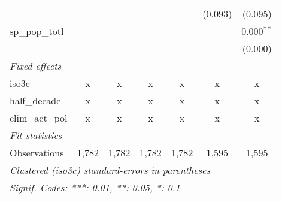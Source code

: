 \begin{tabular}{lcccccc}
                                                     &         &         &         &         & (0.093)        & (0.095)\\   
   sp\_pop\_totl                                     &         &         &         &         &                & 0.000$^{**}$\\   
                                                     &         &         &         &         &                & (0.000)\\   
   \emph{Fixed effects}\\
   iso3c                                             & x       & x       & x       & x       & x              & x\\  
   half\_decade                                      & x       & x       & x       & x       & x              & x\\  
   clim\_act\_pol                                    & x       & x       & x       & x       & x              & x\\  
   \midrule \emph{Fit statistics}\\
   Observations                                      & 1,782   & 1,782   & 1,782   & 1,782   & 1,595          & 1,595\\  
   \midrule
   \multicolumn{7}{l}{\emph{Clustered (iso3c) standard-errors in parentheses}}\\
   \multicolumn{7}{l}{\emph{Signif. Codes: ***: 0.01, **: 0.05, *: 0.1}}\\
\end{tabular}
\par\endgroup


